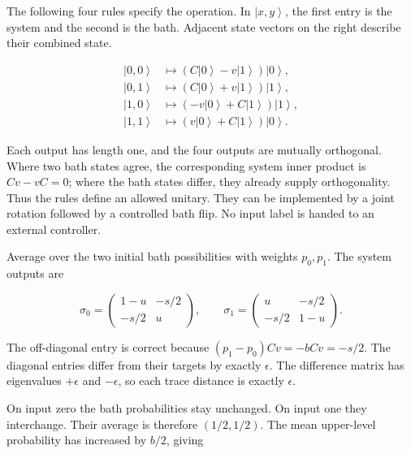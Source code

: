 \documentclass[11pt,letterpaper]{article}
\begin{document}
The following four rules specify the operation. In \(\left| x,y \right\rangle\), the first entry is the system and the second is the bath. Adjacent state vectors on the right describe their combined state.

\[\begin{matrix}
\left| 0,0 \right\rangle & \mapsto \left( C\left| 0 \right\rangle - v\left| 1 \right\rangle \right)\left| 0 \right\rangle, \\
\left| 0,1 \right\rangle & \mapsto \left( C\left| 0 \right\rangle + v\left| 1 \right\rangle \right)\left| 1 \right\rangle, \\
\left| 1,0 \right\rangle & \mapsto \left( - v\left| 0 \right\rangle + C\left| 1 \right\rangle \right)\left| 1 \right\rangle, \\
\left| 1,1 \right\rangle & \mapsto \left( v\left| 0 \right\rangle + C\left| 1 \right\rangle \right)\left| 0 \right\rangle.
\end{matrix}\]

Each output has length one, and the four outputs are mutually orthogonal. Where two bath states agree, the corresponding system inner product is \(Cv - vC = 0\); where the bath states differ, they already supply orthogonality. Thus the rules define an allowed unitary. They can be implemented by a joint rotation followed by a controlled bath flip. No input label is handed to an external controller.

Average over the two initial bath possibilities with weights \(p_{0},p_{1}\). The system outputs are

\[\sigma_{0} = \begin{pmatrix}
1 - u & - s/2 \\
 - s/2 & u
\end{pmatrix},\quad\quad\sigma_{1} = \begin{pmatrix}
u & - s/2 \\
 - s/2 & 1 - u
\end{pmatrix}.\]

The off-diagonal entry is correct because \(\left( p_{1} - p_{0} \right)Cv = - bCv = - s/2\). The diagonal entries differ from their targets by exactly \(\epsilon\). The difference matrix has eigenvalues \(+ \epsilon\) and \(- \epsilon\), so each trace distance is exactly \(\epsilon\).

On input zero the bath probabilities stay unchanged. On input one they interchange. Their average is therefore \((1/2,1/2)\). The mean upper-level probability has increased by \(b/2\), giving
\end{document}
